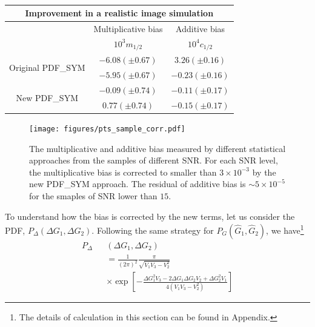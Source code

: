 \documentclass[twocolumn]{aastex62}
\begin{document}
\begin{table}
\centering
\caption{}\label{tb:real_simu}
\begin{tabular}{ccc}
	\multicolumn{3}{c}{Improvement in a realistic image simulation} \\
	\hline 
	\hline 
	& Multiplicative bias& Additive bias \\ 
	& $10^3m_{1/2}$& $10^4c_{1/2}$ \\
	\hline 
	\multirow{2}{*}{Original PDF\_SYM}&  $-6.08(\pm0.67)$&  $3.26(\pm0.16)$\\ 
	&  $-5.95(\pm0.67)$&  $-0.23(\pm0.16)$\\ 
	\hline 
	\multirow{2}{*}{New PDF\_SYM}&  $-0.09(\pm0.74)$&  $-0.11(\pm0.17)$\\ 
	&  $0.77(\pm0.74)$&  $-0.15(\pm0.17)$\\ 
	\hline 
\end{tabular}
\end{table} 

\begin{figure}[htbp]
	\centering
	\texttt{[image: figures/pts\_sample\_corr.pdf]}
	\caption{The multiplicative and additive bias measured by different statistical approaches from the samples of different SNR. For each SNR level, the multiplicative bias is corrected to smaller than $3\times10^{-3}$ by the new PDF\_SYM approach. The residual of additive bias is $\sim 5\times10^{-5}$ for the smaples of SNR lower than $15$.}\label{fig:pts_mc_corr}
\end{figure}


To understand how the bias is corrected by the new terms, let us consider the PDF, $P_{\Delta}(\Delta G_1,\Delta G_2)$. Following the same strategy for $P_G(\hat{G}_1,\hat{G}_2)$, we have\footnote{The details of calculation in this section can be found in Appendix.}
\begin{eqnarray}
P_{\Delta}&&\left(\Delta G_1,\Delta G_2\right)\\ \nonumber
&&=\frac{1}{(2\pi)^2}\frac{\pi}{\sqrt{V_1V_3-V_2^2}}\\ \nonumber
&&\times\exp\left[-\frac{\Delta G_1^2V_3-2\Delta G_1\Delta G_2V_2+\Delta G_2^2V_1}{4(V_1V_3-V_2^2)}\right]
\end{eqnarray}

\end{document}
